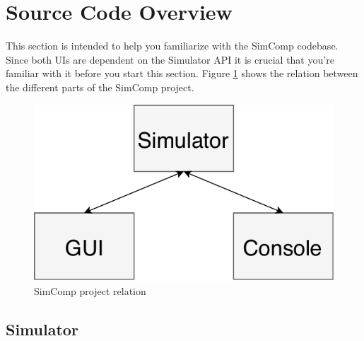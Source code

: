 \section{Source Code Overview}
This section is intended to help you familiarize with the SimComp codebase. Since both UIs are dependent on the Simulator API it is crucial that you're familiar with it before you start this section. Figure \ref{fig:relation} shows the relation between the different parts of the SimComp project.

\begin{figure}[H]
\centering
\includegraphics[scale=0.8]{img/SimComp-relation.pdf}
\caption{SimComp project relation}
\label{fig:relation}
\end{figure}

\subsection{Simulator}
